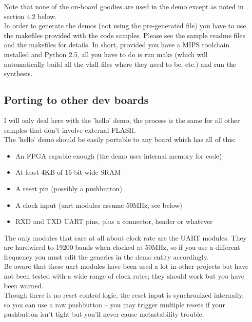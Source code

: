 \documentclass[11pt]{article}
\begin{document}
    Note that none of the on-board goodies are used in the demo except as noted
    in section 4.2 below.\\

    In order to generate the demos (not using the pre-generated file) you
    have to use the makefiles provided with the code samples. Please see 
    the sample readme files and the makefiles for details. In short, provided
    you have a MIPS toolchain installed and Python 2.5, all you have to do
    is run make (which will automatically build all the vhdl files where they
    need to be, etc.) and run the synthesis.\\
    

\subsection{Porting to other dev boards}
\label{porting_hw_demo}

    I will only deal here with the 'hello' demo, the process is the same
    for all other samples that don't involve external FLASH.\\

    The 'hello' demo should be easily portable to any board which has all of 
    this:

    \begin{itemize}
    \item An FPGA capable enough (the demo uses internal memory for code)
    \item At least 4KB of 16-bit wide SRAM
    \item A reset pin (possibly a pushbutton)
    \item A clock input (uart modules assume 50MHz, see below)
    \item RXD and TXD UART pins, plus a connector, header or whatever
    \end{itemize}

    The only modules that care at all about clock rate are the UART
    modules. They are hardwired to 19200 bauds when clocked at 50MHz, so if you
    use a different frequency you must edit the generics in the demo entity
    accordingly.\\
    Be aware that these uart modules have been used a lot in other projects but 
    have not been tested with a wide range of clock rates; they should work but you
    have been warned.\\

    Though there is no reset control logic, the reset input is synchronized 
    internally, so you can use a raw pushbutton -- you may trigger multiple 
    resets if your pushbutton isn't tight but you'll never cause metastability 
    trouble.\\
\end{document}
